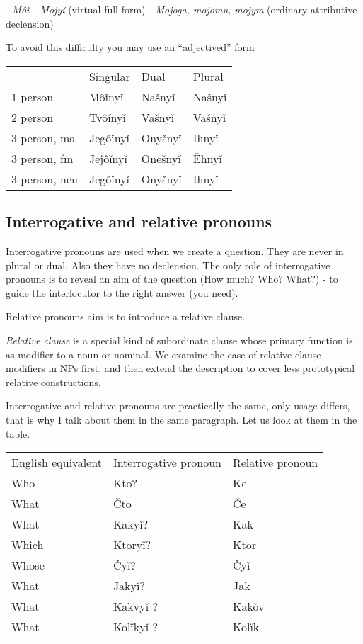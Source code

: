 - \textit{Môǐ - Mojyǐ} (virtual full form) - \textit{Mojoga, mojomu, mojym} (ordinary attributive declension) 

To avoid this difficulty you may use an “adjectived” form

\begin{table}
	\begin{tabular}{llll}
		& Singular & Dual & Plural \\
		1 person & Môǐnyǐ & Našnyǐ & Našnyǐ \\
		2 person & Tvôǐnyǐ & Vašnyǐ & Vašnyǐ \\
		3 person, ms & Jegôǐnyǐ & Onyšnyǐ & Ihnyǐ \\
		3 person, fm & Jejôǐnyǐ & Onešnyǐ & Ěhnyǐ \\
		3 person, neu & Jegôǐnyǐ & Onyšnyǐ & Ihnyǐ
	\end{tabular}
\end{table}

\subsection{Interrogative and relative pronouns}

Interrogative pronouns are used when we create a question. They are never in plural or dual. Also they have no declension. The only role of interrogative pronouns is to reveal an aim of the question (How much? Who? What?) - to guide the interlocutor to the right answer (you need).

Relative pronouns aim is to introduce a relative clause.

\textit{Relative clause} is a special kind of subordinate clause whose primary function is as modifier to a noun or nominal. We examine the case of relative clause modifiers in NPs first, and then extend the description to cover less prototypical relative constructions.\cite{english-grammar}

Interrogative and relative pronouns are practically the same, only usage differs, that is why I talk about them in the same paragraph. Let us look at them in the table.

\begin{table}
	\begin{tabular}{lll}
		English equivalent & Interrogative pronoun & Relative pronoun \\
		Who & Kto? & Ke \\
		What & Čto & Če \\
		What & Kakyǐ? & Kak \\
		Which & Ktoryǐ? & Ktor \\
		Whose & Čyǐ? & Čyǐ \\
		What & Jakyǐ? & Jak \\
		What & Kakvyǐ ? & Kakòv \\
		What & Kolïkyǐ ? & Kolïk 
	\end{tabular}
\end{table}

